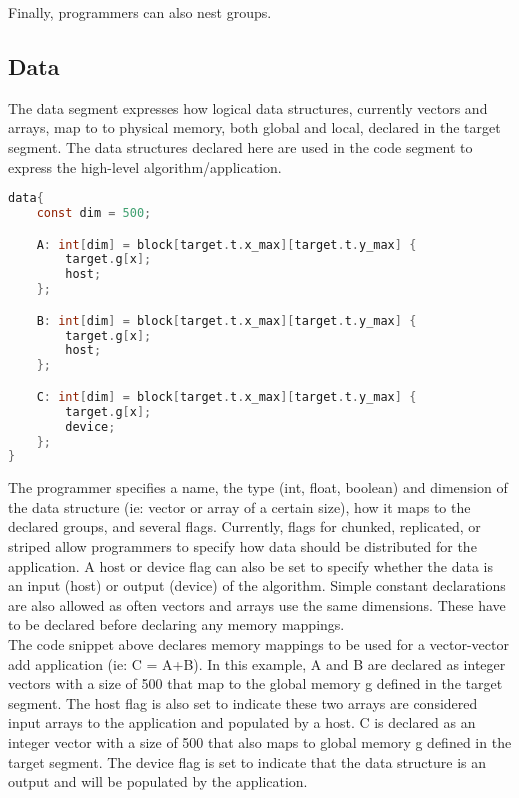 \documentclass{article}
\begin{document}
Finally, programmers can also nest groups. \\ 

\subsection{Data}

The data segment expresses how logical data structures, currently vectors and arrays, map to to physical memory, both global and local, declared in the target segment. The data structures declared here are used in the code segment to express the high-level algorithm/application. \\

\begin{minipage}[c]{\textwidth}
\begin{lstlisting}[language=C, caption=Declaring vector mappings for memory]
data{
    const dim = 500;

    A: int[dim] = block[target.t.x_max][target.t.y_max] {
        target.g[x];
        host;
    };

    B: int[dim] = block[target.t.x_max][target.t.y_max] {
        target.g[x];
        host;
    };

    C: int[dim] = block[target.t.x_max][target.t.y_max] {
        target.g[x];
        device;
    };
}
\end{lstlisting}
\end{minipage}

The programmer specifies a name, the type (int, float, boolean) and dimension of the data structure (ie: vector or array of a certain size), how it maps to the declared groups, and several flags. Currently, flags for chunked, replicated, or striped allow programmers to specify how data should be distributed for the application. A host or device flag can also be set to specify whether the data is an input (host) or output (device) of the algorithm. Simple constant declarations are also allowed as often vectors and arrays use the same dimensions. These have to be declared before declaring any memory mappings. \\

The code snippet above declares memory mappings to be used for a vector-vector add application (ie: C = A+B). In this example, A and B are declared as integer vectors with a size of 500 that map to the global memory g defined in the target segment. The host flag is also set to indicate these two arrays are considered input arrays to the application and populated by a host. C is declared as an integer vector with a size of 500 that also maps to global memory g defined in the target segment. The device flag is set to indicate that the data structure is an output and will be populated by the application. \\
\end{document}
